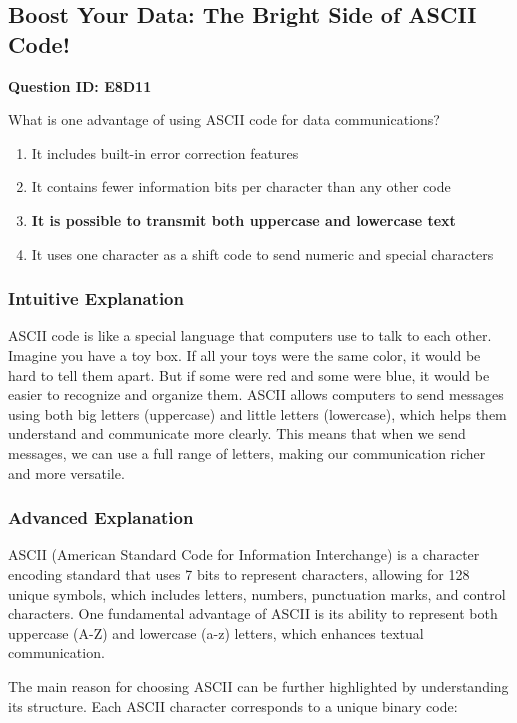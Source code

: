 \subsection{Boost Your Data: The Bright Side of ASCII Code!}

\begin{tcolorbox}
\textbf{Question ID: E8D11}

What is one advantage of using ASCII code for data communications?
\begin{enumerate}[label=\Alph*.]
    \item It includes built-in error correction features
    \item It contains fewer information bits per character than any other code
    \item \textbf{It is possible to transmit both uppercase and lowercase text}
    \item It uses one character as a shift code to send numeric and special characters
\end{enumerate}
\end{tcolorbox}

\subsubsection{Intuitive Explanation}
ASCII code is like a special language that computers use to talk to each other. Imagine you have a toy box. If all your toys were the same color, it would be hard to tell them apart. But if some were red and some were blue, it would be easier to recognize and organize them. ASCII allows computers to send messages using both big letters (uppercase) and little letters (lowercase), which helps them understand and communicate more clearly. This means that when we send messages, we can use a full range of letters, making our communication richer and more versatile.

\subsubsection{Advanced Explanation}
ASCII (American Standard Code for Information Interchange) is a character encoding standard that uses 7 bits to represent characters, allowing for 128 unique symbols, which includes letters, numbers, punctuation marks, and control characters. One fundamental advantage of ASCII is its ability to represent both uppercase (A-Z) and lowercase (a-z) letters, which enhances textual communication.

The main reason for choosing ASCII can be further highlighted by understanding its structure. Each ASCII character corresponds to a unique binary code:

